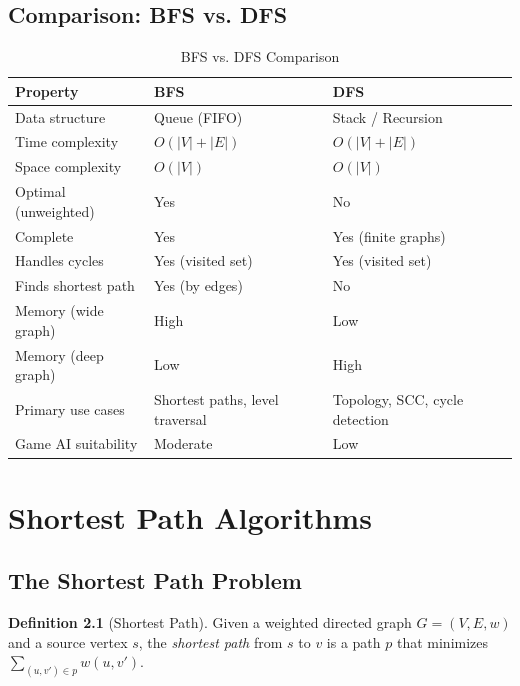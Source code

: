 \documentclass[12pt, a4paper, oneside]{report}
\theoremstyle{definition}
\newtheorem{definition}{Definition}[chapter]
\begin{document}
\section{Comparison: BFS vs. DFS}

\begin{table}[H]
\centering
\caption{BFS vs. DFS Comparison}
\label{tab:bfs_dfs}
\begin{tabular}{lll}
\toprule
\textbf{Property} & \textbf{BFS} & \textbf{DFS} \\
\midrule
Data structure        & Queue (FIFO)       & Stack / Recursion \\
Time complexity       & $O(|V|+|E|)$       & $O(|V|+|E|)$ \\
Space complexity      & $O(|V|)$           & $O(|V|)$ \\
Optimal (unweighted)  & Yes                & No \\
Complete              & Yes                & Yes (finite graphs) \\
Handles cycles        & Yes (visited set)  & Yes (visited set) \\
Finds shortest path   & Yes (by edges)     & No \\
Memory (wide graph)   & High               & Low \\
Memory (deep graph)   & Low                & High \\
Primary use cases     & Shortest paths, level traversal & Topology, SCC, cycle detection \\
Game AI suitability   & Moderate           & Low \\
\bottomrule
\end{tabular}
\end{table}

\chapter{Shortest Path Algorithms}

\section{The Shortest Path Problem}

\begin{definition}[Shortest Path]
Given a weighted directed graph $G = (V, E, w)$ and a source vertex $s$, the \emph{shortest path} from $s$ to $v$ is a path $p$ that minimizes $\sum_{(u,v') \in p} w(u,v')$.
\end{definition}
\end{document}
